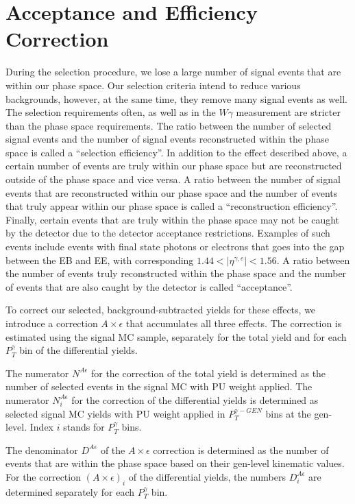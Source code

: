 \section{Acceptance and Efficiency Correction}
\label{sec:AccXEff}

During the selection procedure, we lose a large number of signal events that are within our phase space. Our selection criteria intend to reduce various backgrounds, however, at the same time, they remove many signal events as well. The selection requirements often, as well as in the $W\gamma$ measurement are stricter than the phase space requirements. The ratio between the number of selected signal events and the number of signal events reconstructed within the phase space is called a ``selection efficiency''. In addition to the effect described above, a certain number of events are truly within our phase space but are reconstructed outside of the phase space and vice versa. A ratio between the number of signal events that are reconstructed within our phase space and the number of events that truly appear within our phase space is called a ``reconstruction efficiency''. Finally, certain events that are truly within the phase space may not be caught by the detector due to the detector acceptance restrictions. Examples of such events include events with final state photons or electrons that goes into the gap between the EB and EE, with corresponding $1.44<|\eta^{\gamma,e}|<1.56$. A ratio between the number of events truly reconstructed within the phase space and the number of events that are also caught by the detector is called ``acceptance''.  

To correct our selected, background-subtracted yields for these effects, we introduce a correction $A \times \epsilon$ that accumulates all three effects. The correction is estimated using the signal MC sample, separately for the total yield and for each $P_T^{\gamma}$ bin of the differential yields. 

The numerator $N^{A\epsilon}$ for the correction of the total yield is determined as the number of selected events in the signal MC with PU weight applied. The numerator $N^{A\epsilon}_i$ for the correction of the differential yields is determined as selected signal MC yields with PU weight applied in $P_T^{\gamma-GEN}$ bins at the gen-level. Index $i$ stands for $P_T^{\gamma}$ bins.

The denominator $D^{A\epsilon}$ of the $A \times \epsilon$ correction is determined as the number of events that are within the phase space based on their gen-level kinematic values. For the correction $(A \times \epsilon)_i$ of the differential yields, the numbers $D^{A\epsilon}_{i}$ are determined separately for each $P_T^\gamma$ bin.  

